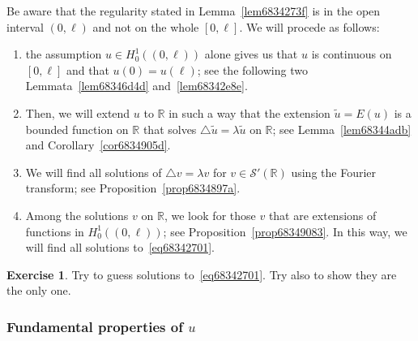 \documentclass[a4paper,9pt]{amsart}
\newcommand{\scr}[1]{\mathscr{#1}}
\newcommand{\R}{\mathbb{R}}	%
\newcommand{\laplacian}{\triangle}
\theoremstyle{plain}
\theoremstyle{definition}
\newtheorem{exercise}[proposition]{Exercise}%
\theoremstyle{remark}
\begin{document}
Be aware that the regularity stated in Lemma~\ref{lem6834273f} is in the open interval $(0,\ell)$ and not on the whole $[0,\ell]$.
We will procede as follows:
\begin{enumerate}
\item
	the assumption $u\in H^1_0((0,\ell))$ alone gives us that $u$ is continuous on $[0,\ell]$
and that $u(0)=u(\ell)$;
see the following two Lemmata~\ref{lem68346d4d} and~\ref{lem68342e8e}.
\item
	Then, we will extend $u$ to $\R$ in such a way that the extension $\tilde u =E(u)$ is a bounded function on $\R$ that solves $\laplacian \tilde u=\lambda \tilde u$ on $\R$; see Lemma~\ref{lem68344adb} and Corollary~\ref{cor6834905d}.
\item
	We will find all solutions of $\laplacian v=\lambda v$ for $v\in \scr S'(\R)$ using the Fourier transform; see Proposition~\ref{prop6834897a}.
\item
	Among the solutions $v$ on $\R$, we look for those $v$ that are extensions of functions in $H^1_0((0,\ell))$;
	see Proposition~\ref{prop68349083}. 
	In this way, we will find all solutions to~\eqref{eq68342701}.
\end{enumerate}


\begin{exercise}
	Try to guess solutions to~\eqref{eq68342701}.
	Try also to show they are the only one.
\end{exercise}

\subsubsection{Fundamental properties of $u$}
\end{document}

